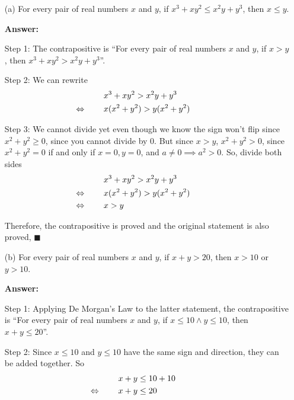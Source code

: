 \documentclass[14pt]{extreport}
\newcommand{\eq}[0]{\llap{\( \Leftrightarrow \) \qquad}}
\newcommand{\answer}[0]{\medskip \textbf{Answer:} \medskip}
\begin{document}
\begin{enumerate}
        \begin{enumerate}

            \item[(a)] For every pair of real numbers \( x \) and \( y \), if \( x^3 + xy^2 \leq x^2y + y^3 \), then \( x \leq y \).
            
                \answer

                Step 1: The contrapositive is ``For every pair of real numbers \( x \) and \( y \), if \( x > y \), then \( x^3 + xy^2 > x^2y + y^3 \)''.

                \medskip

                Step 2: We can rewrite
                \begin{align*}
                    & x^3 + xy^2 > x^2y + y^3 \\
                    &\eq x(x^2 + y^2) > y(x^2 + y^2)
                \end{align*}

                Step 3: We cannot divide yet even though we know the sign won't flip since \( x^2 + y^2 \geq 0 \), since you cannot divide by 0. But since \( x > y \), \( x^2 + y^2 > 0 \), since \( x^2 + y^2 = 0 \) if and only if \( x = 0, y = 0 \), and \( a \neq 0 \implies a^2 > 0 \). So, divide both sides 
                \begin{align*}
                    & x^3 + xy^2 > x^2y + y^3 \\
                    & \eq x(x^2 + y^2) > y(x^2 + y^2) \\
                    & \eq x > y
                \end{align*}

                Therefore, the contrapositive is proved and the original statement is also proved, \( \blacksquare \)

            \item[(b)] For every pair of real numbers \( x \) and \( y \), if \( x + y > 20 \), then \( x > 10 \) or \( y > 10 \).
            
                \answer

                Step 1: Applying De Morgan's Law to the latter statement, the contrapositive is ``For every pair of real numbers \( x \) and \( y \), if \( x \leq 10 \land y \leq 10 \), then \( x + y \leq 20 \)''.

                \medskip

                Step 2: Since \( x \leq 10 \) and \( y \leq 10 \) have the same sign and direction, they can be added together. So
                \begin{align*}
                    & x + y \leq 10 + 10 \\
                    &\eq x + y \leq 20
                \end{align*}


\end{enumerate}
\end{enumerate}
\end{document}
